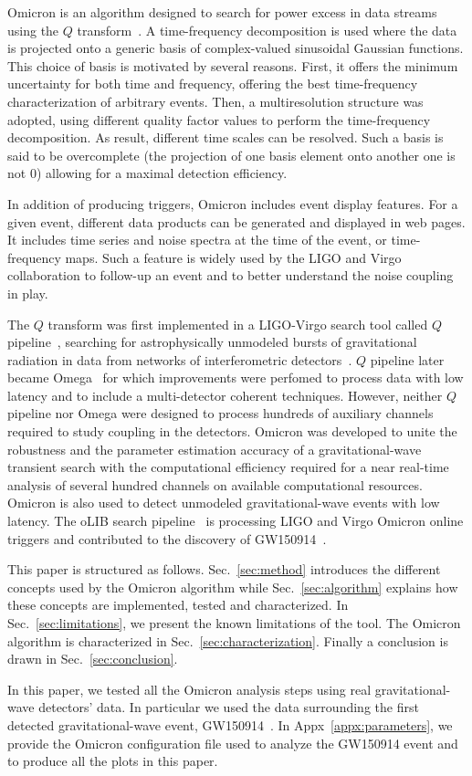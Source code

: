 Omicron is an algorithm designed to search for power excess in data streams using the $Q$ transform~\cite{Brown:1991}. A time-frequency decomposition is used where the data is projected onto a generic basis of complex-valued sinusoidal Gaussian functions. This choice of basis is motivated by several reasons. First, it offers the minimum uncertainty for both time and frequency, offering the best time-frequency characterization of arbitrary events. Then, a multiresolution structure was adopted, using different quality factor values to perform the time-frequency decomposition. As result, different time scales can be resolved. Such a basis is said to be overcomplete (the projection of one basis element onto another one is not 0) allowing for a maximal detection efficiency.

In addition of producing triggers, Omicron includes event display features. For a given event, different data products can be generated and displayed in web pages. It includes time series and noise spectra at the time of the event, or time-frequency maps. Such a feature is widely used by the LIGO and Virgo collaboration to follow-up an event and to better understand the noise coupling in play.

The $Q$ transform was first implemented in a LIGO-Virgo search tool called $Q$ pipeline~\cite{Chatterji:2004}, searching for astrophysically unmodeled bursts of gravitational radiation in data from networks of interferometric detectors~\cite{Abbott:2009zi,Abbott:2009up,Abadie:2010mt}. $Q$ pipeline later became Omega~\cite{Rollins:2011} for which improvements were perfomed to process data with low latency and to include a multi-detector coherent techniques. However, neither $Q$ pipeline nor Omega were designed to process hundreds of auxiliary channels required to study coupling in the detectors. Omicron was developed to unite the robustness and the parameter estimation accuracy of a gravitational-wave transient search with the computational efficiency required for a near real-time analysis of several hundred channels on available computational resources. Omicron is also used to detect unmodeled gravitational-wave events with low latency. The oLIB search pipeline~\cite{Lynch:2015yin} is processing LIGO and Virgo Omicron online triggers and contributed to the discovery of GW150914~\cite{TheLIGOScientific:2016uux}.

This paper is structured as follows. Sec.~\ref{sec:method} introduces the different concepts used by the Omicron algorithm while Sec.~\ref{sec:algorithm} explains how these concepts are implemented, tested and characterized. In Sec.~\ref{sec:limitations}, we present the known limitations of the tool. The Omicron algorithm is characterized in Sec.~\ref{sec:characterization}. Finally a conclusion is drawn in Sec.~\ref{sec:conclusion}.

In this paper, we tested all the Omicron analysis steps using real gravitational-wave detectors' data. In particular we used the data surrounding the first detected gravitational-wave event, GW150914~\cite{GW150914data}. In Appx~\ref{appx:parameters}, we provide the Omicron configuration file used to analyze the GW150914 event and to produce all the plots in this paper.




